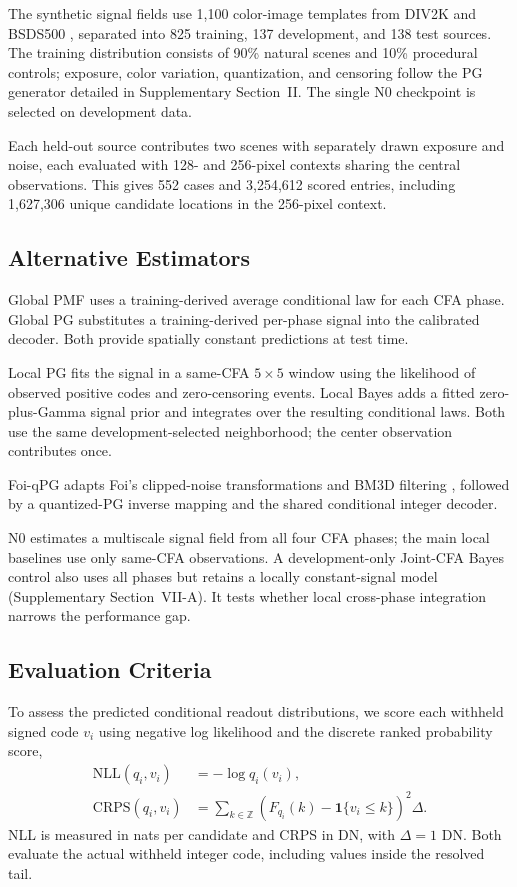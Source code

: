 \documentclass[10pt,twocolumn,journal]{IEEEtran}
\begin{document}
The synthetic signal fields use 1,100 color-image templates from DIV2K and BSDS500 \cite{div2k,bsds500}, separated into 825 training, 137 development, and 138 test sources. The training distribution consists of 90\% natural scenes and 10\% procedural controls; exposure, color variation, quantization, and censoring follow the PG generator detailed in Supplementary Section~II. The single N0 checkpoint is selected on development data.

Each held-out source contributes two scenes with separately drawn exposure and noise, each evaluated with 128- and 256-pixel contexts sharing the central observations. This gives 552 cases and 3,254,612 scored entries, including 1,627,306 unique candidate locations in the 256-pixel context.






\subsection{Alternative Estimators}\label{sec:baselines}
Global PMF uses a training-derived average conditional law for each CFA phase. Global PG substitutes a training-derived per-phase signal into the calibrated decoder. Both provide spatially constant predictions at test time.

Local PG fits the signal in a same-CFA $5\times5$ window using the likelihood of observed positive codes and zero-censoring events. Local Bayes adds a fitted zero-plus-Gamma signal prior and integrates over the resulting conditional laws. Both use the same development-selected neighborhood; the center observation contributes once.

Foi-qPG adapts Foi's clipped-noise transformations \cite{foi2009} and BM3D filtering \cite{bm3d}, followed by a quantized-PG inverse mapping and the shared conditional integer decoder.

N0 estimates a multiscale signal field from all four CFA phases; the main local baselines use only same-CFA observations. A development-only Joint-CFA Bayes control also uses all phases but retains a locally constant-signal model (Supplementary Section~VII-A). It tests whether local cross-phase integration narrows the performance gap.

\subsection{Evaluation Criteria}
To assess the predicted conditional readout distributions, we score each withheld signed code $v_i$ using negative log likelihood and the discrete ranked probability score,
\begin{align}
\mathrm{NLL}(q_i,v_i)&=-\log q_i(v_i),\label{eq:nll}\\
\mathrm{CRPS}(q_i,v_i)&=\sum_{k\in\mathbb Z}
\left(F_{q_i}(k)-\mathbf{1}\{v_i\leq k\}\right)^2\Delta.\label{eq:crps}
\end{align}
NLL is measured in nats per candidate and CRPS in DN, with $\Delta=1$ DN. Both evaluate the actual withheld integer code, including values inside the resolved tail.
\end{document}
